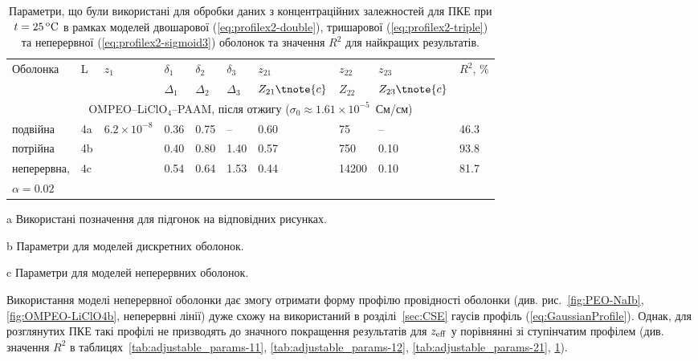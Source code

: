 \documentclass[14pt,twoside]{vakthesis}
\begin{document}
\begin{table}[!htb]
	\centering \caption{\label{tab:adjustable_params-22} Параметри, що були
		використані для обробки даних \cite{Przl1995,Wiec1994} з 
		концентраційних залежностей для ПКЕ при $t= 25\,\rm{^oC}$ в 
		рамках моделей двошарової (\ref{eq:profilex2-double}), тришарової (\ref{eq:profilex2-triple}) 
		та неперервної 
		(\ref{eq:profilex2-sigmoid3}) оболонок та значення $R^2$
		для найкращих результатів.}
	\begin{threeparttable}
		\begin{tabularx}{\textwidth}{|X|l|X|l|l|l|l|l|l|l|}
			\hline
			\multirow{2}{*}{Оболонка} &\multirow{2}{*}{L\tnote{a}} &   \multirow{2}{*}{${z}_1$} & $\delta_1$\tnote{b} & $\delta_2$\tnote{b} & $\delta_3$\tnote{b} & ${z}_{21}$\tnote{b} & ${z}_{22}$\tnote{b} & ${z}_{23}$\tnote{b} & \multirow{2}{*}{$R^2$, \%} \\
			&  & & $\Delta_1$\tnote{c}& $\Delta_2$\tnote{c}&$\Delta_3$\tnote{c}&${Z}_{21}\tnote{c}$&${Z}_{22}$\tnote{c}&${Z}_{23} \tnote{c}$ & \\
			\hline
			\multicolumn{10}{c}{OMPEO--LiClO$_4$--PAAM, після отжигу ($\sigma_0 \approx 1.61\times 10^{-5}$~См/см)}\\
			\hline
			подвійна   &4a  & \multirow{4}{*}{$6.2\times 10^{-8}$} &0.36&0.75& -- &0.60& 75 &--& 46.3\\
			потрійна   & 4b                  &                    &0.40&0.80&1.40&0.57& 750&0.10 &  93.8\\
			неперервна, &4c                     &                    &0.54&0.64&1.53&0.44&14200&0.10 &  81.7\\
			$\alpha =0.02$ &  &  & & & & &  & & \\
			\hline
		\end{tabularx}
		\begin{tablenotes}
			\item[a] Використані позначення для підгонок на відповідних
			рисунках.
			\item[b] Параметри для моделей дискретних оболонок.
			\item[c] Параметри для моделей неперервних оболонок.
		\end{tablenotes}
	\end{threeparttable}
\end{table}

Використання моделі неперервної оболонки дає змогу отримати форму профілю провідності оболонки (див. рис.~\ref{fig:PEO-NaIb}, \ref{fig:OMPEO-LiClO4b}, неперервні лінії) дуже схожу на використаний в розділі~\ref{sec:CSE} гаусів профіль (\ref{eq:GaussianProfile}).
Однак, для розглянутих ПКЕ такі профілі не призводять до значного покращення результатів для ${z}_{\rm eff}$ у порівнянні зі ступінчатим профілем {\color{violet}(див. значення $R^2$ в таблицях~\ref{tab:adjustable_params-11}, \ref{tab:adjustable_params-12}, \ref{tab:adjustable_params-21}, \ref{tab:adjustable_params-22})}.
\end{document}

